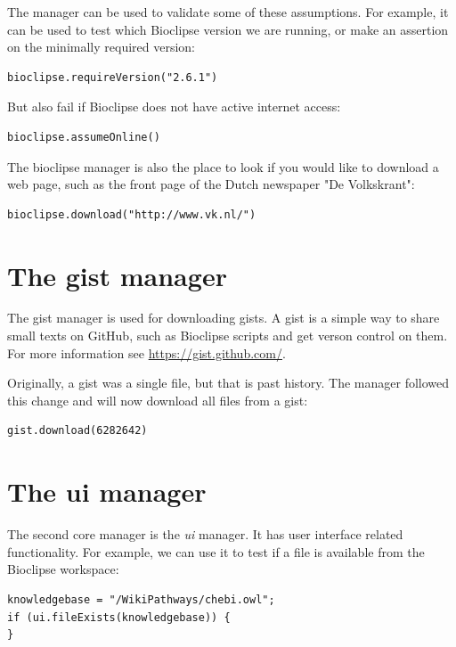 \documentclass{book}
\begin{document}
\begin{refsection}
The manager can be used to validate some of these assumptions.
For example, it can be used
to test which Bioclipse version we are running, or make an
assertion on the minimally required version:

\begin{Verbatim}
bioclipse.requireVersion("2.6.1")
\end{Verbatim}

But also fail if Bioclipse does not have active internet
access:

\begin{Verbatim}
bioclipse.assumeOnline()
\end{Verbatim}

The bioclipse manager is also the place to look if you would like
to download a web page, such as the front page of the Dutch
newspaper "De Volkskrant":

\begin{Verbatim}
bioclipse.download("http://www.vk.nl/")
\end{Verbatim}


\section{The gist manager}

The gist manager is used for downloading gists. A gist is a
simple way to share small texts on GitHub,
such as Bioclipse scripts and get verson control on them.
For more information see \url{https://gist.github.com/}.

Originally, a gist was a single file, but that is past
history. The manager followed this change and will now download
all files from a gist:

\begin{Verbatim}
gist.download(6282642)
\end{Verbatim}


\section{The ui manager}

The second core manager is the \emph{ui} manager. It has user
interface related functionality. For example, we can use it to
test if a file is available from the Bioclipse workspace:

\begin{Verbatim}
knowledgebase = "/WikiPathways/chebi.owl";
if (ui.fileExists(knowledgebase)) {
}
\end{Verbatim}


\end{refsection}
\end{document}
